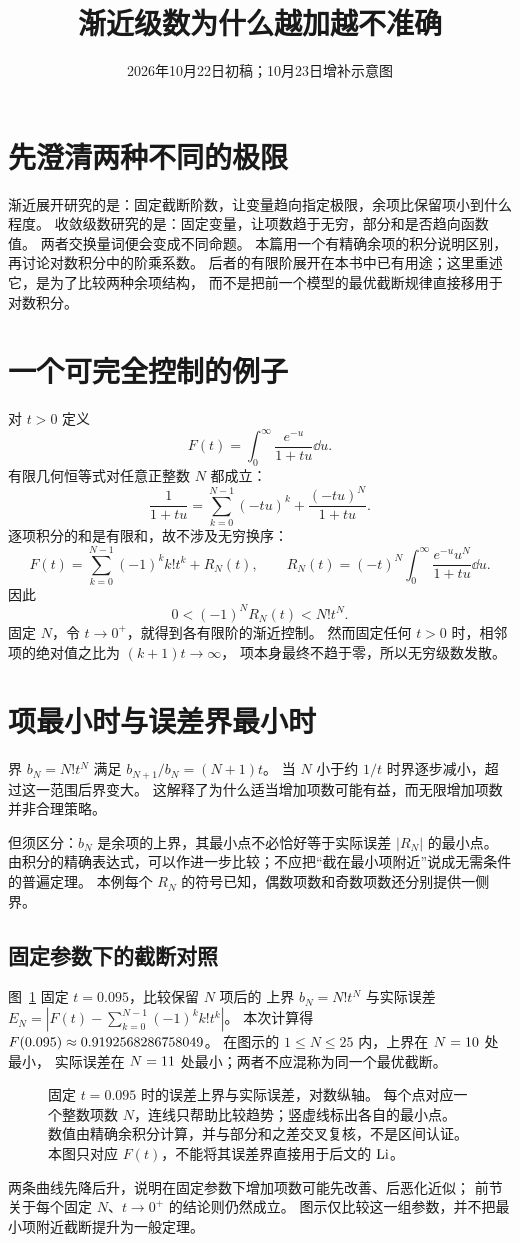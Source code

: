 \documentclass[UTF8,fontset=fandol,11pt]{ctexart}
\date{2026年10月22日初稿；10月23日增补示意图}
\title{渐近级数为什么越加越不准确}
\begin{document}
\maketitle
\draftnotice
\section{先澄清两种不同的极限}
渐近展开研究的是：固定截断阶数，让变量趋向指定极限，余项比保留项小到什么程度。
收敛级数研究的是：固定变量，让项数趋于无穷，部分和是否趋向函数值。
两者交换量词便会变成不同命题。
本篇用一个有精确余项的积分说明区别，再讨论对数积分中的阶乘系数。
后者的有限阶展开在本书中已有用途；这里重述它，是为了比较两种余项结构，
而不是把前一个模型的最优截断规律直接移用于对数积分。

\section{一个可完全控制的例子}
对 $t>0$ 定义
\[
 F(t)=\int_0^\infty\frac{e^{-u}}{1+tu}\dd u.
\]
有限几何恒等式对任意正整数 $N$ 都成立：
\[
 \frac1{1+tu}=\sum_{k=0}^{N-1}(-tu)^k+\frac{(-tu)^N}{1+tu}.
\]
逐项积分的和是有限和，故不涉及无穷换序：
\[
 F(t)=\sum_{k=0}^{N-1}(-1)^kk!t^k+R_N(t),\qquad
 R_N(t)=(-t)^N\int_0^\infty\frac{e^{-u}u^N}{1+tu}\dd u.
\]
因此
\[
 0<(-1)^NR_N(t)<N!t^N.
\]
固定 $N$，令 $t\to0^+$，就得到各有限阶的渐近控制。
然而固定任何 $t>0$ 时，相邻项的绝对值之比为 $(k+1)t\to\infty$，
项本身最终不趋于零，所以无穷级数发散。

\section{项最小时与误差界最小时}
界 $b_N=N!t^N$ 满足 $b_{N+1}/b_N=(N+1)t$。
当 $N$ 小于约 $1/t$ 时界逐步减小，超过这一范围后界变大。
这解释了为什么适当增加项数可能有益，而无限增加项数并非合理策略。

但须区分：$b_N$ 是余项的上界，其最小点不必恰好等于实际误差 $|R_N|$ 的最小点。
由积分的精确表达式，可以作进一步比较；不应把“截在最小项附近”说成无需条件的普遍定理。
本例每个 $R_N$ 的符号已知，偶数项数和奇数项数还分别提供一侧界。

\subsection*{固定参数下的截断对照}

图~\ref{fig:asymptotic-truncation} 固定 $t=0.095$，比较保留 $N$ 项后的
上界 $b_N=N!t^N$ 与实际误差
$E_N=|F(t)-\sum_{k=0}^{N-1}(-1)^kk!t^k|$。
本次计算得 $F(0.095)\approx0.9192568286758049$。
在图示的 $1\le N\le25$ 内，上界在 $N=10$ 处最小，
实际误差在 $N=11$ 处最小；两者不应混称为同一个最优截断。
\begin{figure}[H]
\centering

\caption{固定 $t=0.095$ 时的误差上界与实际误差，对数纵轴。
每个点对应一个整数项数 $N$，连线只帮助比较趋势；竖虚线标出各自的最小点。
数值由精确余积分计算，并与部分和之差交叉复核，不是区间认证。
本图只对应 $F(t)$，不能将其误差界直接用于后文的 $\operatorname{Li}$。}
\label{fig:asymptotic-truncation}
\end{figure}
两条曲线先降后升，说明在固定参数下增加项数可能先改善、后恶化近似；
前节关于每个固定 $N$、$t\to0^+$ 的结论则仍然成立。
图示仅比较这一组参数，并不把最小项附近截断提升为一般定理。
\end{document}
